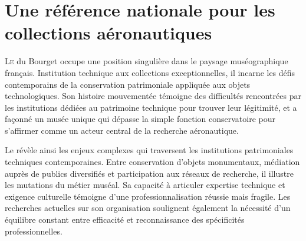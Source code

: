 \chapter[Référence nationale]{\label{I-A}Une référence nationale pour les collections aéronautiques}

\lettrine{L}e \mae du Bourget occupe une position singulière dans le paysage muséographique français. Institution technique aux collections exceptionnelles, il incarne les défis contemporains de la conservation patrimoniale appliquée aux objets technologiques. Son histoire mouvementée témoigne des difficultés rencontrées par les institutions dédiées au patrimoine technique pour trouver leur légitimité, et a façonné un musée unique qui dépasse la simple fonction conservatoire pour s'affirmer comme un acteur central de la recherche aéronautique.






\bigskip
\bigskip
\bigskip

Le \mae révèle ainsi les enjeux complexes qui traversent les institutions patrimoniales techniques contemporaines. Entre conservation d'objets monumentaux, médiation auprès de publics diversifiés et participation aux réseaux de recherche, il illustre les mutations du métier muséal. Sa capacité à articuler expertise technique et exigence culturelle témoigne d'une professionnalisation réussie mais fragile. Les recherches actuelles sur son organisation soulignent également la nécessité d'un équilibre constant entre efficacité et reconnaissance des spécificités professionnelles.